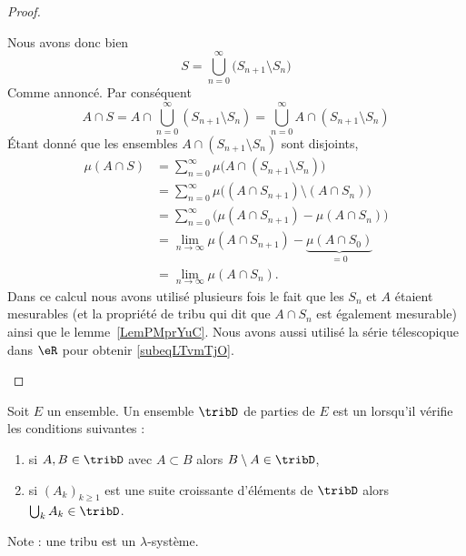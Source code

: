 \begin{proof}
\begin{subproof}
		Nous avons donc bien
		\begin{equation}
			S=\bigcup_{n=0}^{\infty}\big( S_{n+1}\setminus S_n \big)
		\end{equation}
		Comme annoncé.
		Par conséquent
		\begin{equation}
			A\cap S = A\cap\bigcup_{n=0}^{\infty}(S_{n+1}\setminus S_n)
			= \bigcup_{n=0}^{\infty}A\cap(S_{n+1}\setminus S_n)
		\end{equation}
		Étant donné que les ensembles \( A\cap(S_{n+1}\setminus S_n)\) sont disjoints,
		\begin{subequations}
			\begin{align}
				\mu(A\cap S) & =\sum_{n=0}^{\infty}\mu\big( A\cap(S_{n+1}\setminus S_n) \big)                                 \\
				             & =\sum_{n=0}^{\infty}\mu\Big( (A\cap S_{n+1})\setminus (A\cap S_n) \Big)                        \\
				             & =\sum_{n=0}^{\infty}\big( \mu(A\cap S_{n+1})-\mu(A\cap S_n) \big)                              \\
				             & =\lim_{n\to \infty} \mu(A\cap S_{n+1})-\underbrace{\mu(A\cap S_0)}_{=0}   \label{subeqLTvmTjO} \\
				             & =\lim_{n\to \infty} \mu(A\cap S_n).
			\end{align}
		\end{subequations}
		Dans ce calcul nous avons utilisé plusieurs fois le fait que les \( S_n\) et \( A\) étaient mesurables (et la propriété de tribu qui dit que \( A\cap S_n\) est également mesurable) ainsi que le lemme~\ref{LemPMprYuC}. Nous avons aussi utilisé la série télescopique dans \( \eR\) pour obtenir \eqref{subeqLTvmTjO}.
	\end{subproof}
\end{proof}

\begin{definition}      \label{DefRECXooWwYgej}
	Soit \( E\) un ensemble. Un ensemble \( \tribD\) de parties de \( E\) est un  lorsqu'il vérifie les conditions suivantes :
	\begin{enumerate}
		\item
		      si \( A,B\in\tribD\) avec \( A\subset B\) alors \( B\setminus A\in \tribD\),
		\item
		      si \( (A_k)_{k\geq 1}\) est une suite croissante d'éléments de \( \tribD\) alors \( \bigcup_kA_k\in\tribD\).
	\end{enumerate}
\end{definition}
Note : une tribu est un \( \lambda\)-système.

